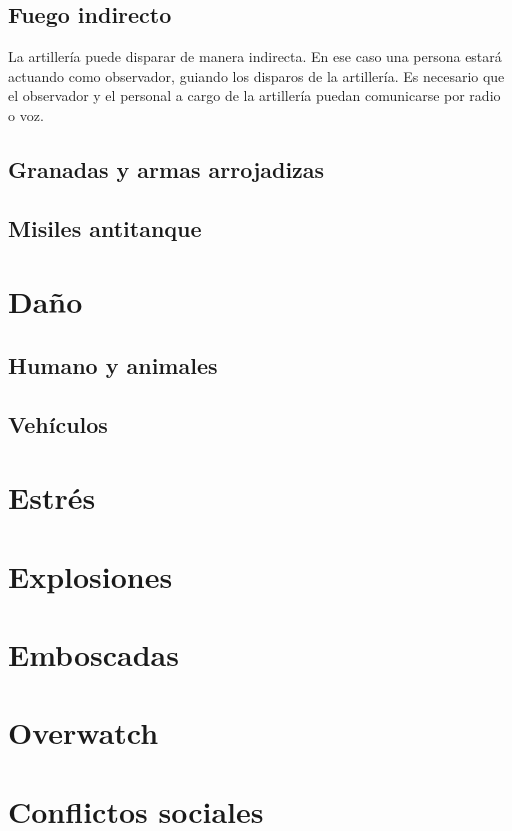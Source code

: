     \subsection{Fuego indirecto}
    La artillería puede disparar de manera indirecta. En ese caso una persona estará actuando como observador, guiando los disparos de la artillería. Es necesario que el observador y el personal a cargo de la artillería puedan comunicarse por radio o voz.

    \subsection{Granadas y armas arrojadizas}\label{page:granade}

    \subsection{Misiles antitanque}

\section{Daño}

    \subsection{Humano y animales}

    \subsection{Vehículos}

\section{Estrés}

\section{Explosiones}

\section{Emboscadas}

\section{Overwatch}

\section{Conflictos sociales}

